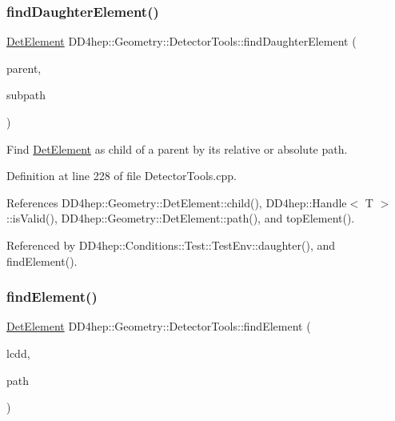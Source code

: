 \subsubsection{\texorpdfstring{find\+Daughter\+Element()}{findDaughterElement()}}
{\footnotesize\ttfamily \hyperlink{class_d_d4hep_1_1_geometry_1_1_det_element}{Det\+Element} D\+D4hep\+::\+Geometry\+::\+Detector\+Tools\+::find\+Daughter\+Element (\begin{DoxyParamCaption}\item[{\hyperlink{class_d_d4hep_1_1_geometry_1_1_det_element}{Det\+Element}}]{parent,  }\item[{const std\+::string \&}]{subpath }\end{DoxyParamCaption})}



Find \hyperlink{class_d_d4hep_1_1_geometry_1_1_det_element}{Det\+Element} as child of a parent by it\textquotesingle{}s relative or absolute path. 



Definition at line 228 of file Detector\+Tools.\+cpp.



References D\+D4hep\+::\+Geometry\+::\+Det\+Element\+::child(), D\+D4hep\+::\+Handle$<$ T $>$\+::is\+Valid(), D\+D4hep\+::\+Geometry\+::\+Det\+Element\+::path(), and top\+Element().



Referenced by D\+D4hep\+::\+Conditions\+::\+Test\+::\+Test\+Env\+::daughter(), and find\+Element().

\hypertarget{namespace_d_d4hep_1_1_geometry_1_1_detector_tools_a70cde605976780186eb6b226731ed380}{}\label{namespace_d_d4hep_1_1_geometry_1_1_detector_tools_a70cde605976780186eb6b226731ed380} 
\subsubsection{\texorpdfstring{find\+Element()}{findElement()}}
{\footnotesize\ttfamily \hyperlink{class_d_d4hep_1_1_geometry_1_1_det_element}{Det\+Element} D\+D4hep\+::\+Geometry\+::\+Detector\+Tools\+::find\+Element (\begin{DoxyParamCaption}\item[{\hyperlink{class_d_d4hep_1_1_geometry_1_1_l_c_d_d}{L\+C\+DD} \&}]{lcdd,  }\item[{const std\+::string \&}]{path }\end{DoxyParamCaption})}



